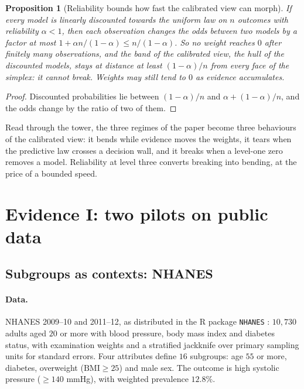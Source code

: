 \documentclass[11pt]{article}
\newtheorem{proposition}[theorem]{Proposition}
\theoremstyle{definition}
\theoremstyle{remark}
\begin{document}
\begin{proposition}[Reliability bounds how fast the calibrated view can morph]\label{prop:morph}
If every model is linearly discounted towards the uniform law on $n$ outcomes with reliability $\alpha<1$, then each observation changes the
odds between two models by a factor at most $1+\alpha n/(1-\alpha)\le n/(1-\alpha)$. So no weight reaches $0$ after finitely many observations,
and the band of the calibrated view, the hull of the discounted models, stays at distance at least $(1-\alpha)/n$ from every face of the
simplex: it cannot break. Weights may still tend to $0$ as evidence accumulates.
\end{proposition}
\begin{proof}
Discounted probabilities lie between $(1-\alpha)/n$ and $\alpha+(1-\alpha)/n$, and the odds change by the ratio of two of them.
\end{proof}

Read through the tower, the three regimes of the paper become three behaviours of the calibrated view: it bends while evidence moves
the weights, it tears when the predictive law crosses a decision wall, and it breaks when a level-one zero removes a model. Reliability at
level three converts breaking into bending, at the price of a bounded speed.

\section{Evidence I: two pilots on public data}\label{sec:pilots}

\subsection{Subgroups as contexts: NHANES}\label{sec:nhanes}

\paragraph{Data.} NHANES 2009--10 and 2011--12, as distributed in the R package \texttt{NHANES} \cite{NHANESpkg}: $10{,}730$ adults
aged $20$ or more with blood pressure, body mass index and diabetes status, with examination weights and a stratified jackknife
over primary sampling units for standard errors. Four attributes define $16$ subgroups: age $55$ or more, diabetes, overweight
($\mathrm{BMI}\ge25$) and male sex. The outcome is high systolic pressure ($\ge140$ mmHg), with weighted prevalence $12.8\%$.
\end{document}
